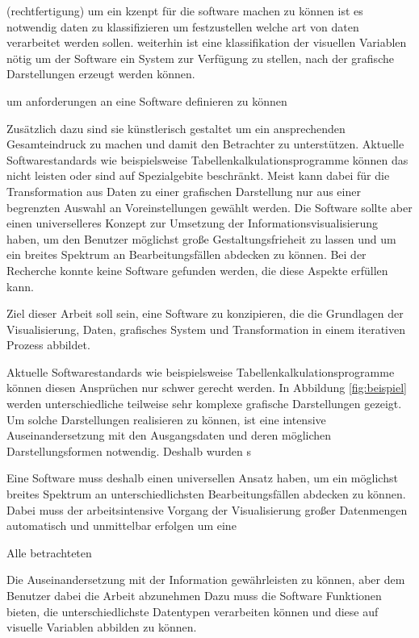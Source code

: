 \documentclass[a4paper, 12pt, DIVcalc, onepage, pdftex, headsepline, footsepline]{scrreprt}
\begin{document}
(rechtfertigung)
um ein kzenpt für die software machen zu können ist es notwendig daten zu klassifizieren um festzustellen
welche art von daten verarbeitet werden sollen. weiterhin ist eine klassifikation der visuellen Variablen nötig
um der Software ein System zur Verfügung zu stellen, nach der grafische Darstellungen erzeugt werden können.

um anforderungen an eine Software definieren zu können


Zusätzlich dazu sind
sie künstlerisch gestaltet um ein ansprechenden Gesamteindruck zu machen und damit den Betrachter zu
unterstützen.
Aktuelle Softwarestandards wie beispielsweise Tabellenkalkulationsprogramme können das nicht leisten
oder sind auf Spezialgebite beschränkt. Meist kann dabei für die Transformation aus Daten zu einer
grafischen Darstellung nur aus einer begrenzten Auswahl an Voreinstellungen gewählt werden.
Die Software sollte aber einen universelleres Konzept zur Umsetzung der Informationsvisualisierung haben, um den Benutzer möglichst große
Gestaltungsfrieheit zu lassen und um ein breites Spektrum an Bearbeitungsfällen abdecken zu können.
Bei der Recherche konnte keine Software gefunden werden, die diese Aspekte erfüllen kann.

Ziel dieser Arbeit soll sein, eine Software zu konzipieren, die die Grundlagen der Visualisierung,
Daten, grafisches System und Transformation in einem iterativen Prozess abbildet.




Aktuelle Softwarestandards wie beispielsweise Tabellenkalkulationsprogramme können diesen Ansprüchen
nur schwer gerecht werden. In Abbildung \ref{fig:beispiel} werden unterschiedliche teilweise
sehr komplexe grafische Darstellungen gezeigt. Um solche Darstellungen realisieren zu können, ist
eine intensive Auseinandersetzung mit den Ausgangsdaten und deren möglichen Darstellungsformen
notwendig. Deshalb wurden s


Eine Software muss deshalb einen universellen Ansatz haben, um ein möglichst breites Spektrum an
unterschiedlichsten Bearbeitungsfällen abdecken zu können. Dabei muss der arbeitsintensive Vorgang
der Visualisierung großer Datenmengen automatisch und unmittelbar erfolgen um eine 





Alle betrachteten



Die Auseinandersetzung mit der Information gewährleisten zu können, aber dem Benutzer dabei die Arbeit abzunehmen 
Dazu muss die Software Funktionen bieten, die unterschiedlichste Datentypen verarbeiten können und diese auf visuelle Variablen
abbilden zu können.
\end{document}
